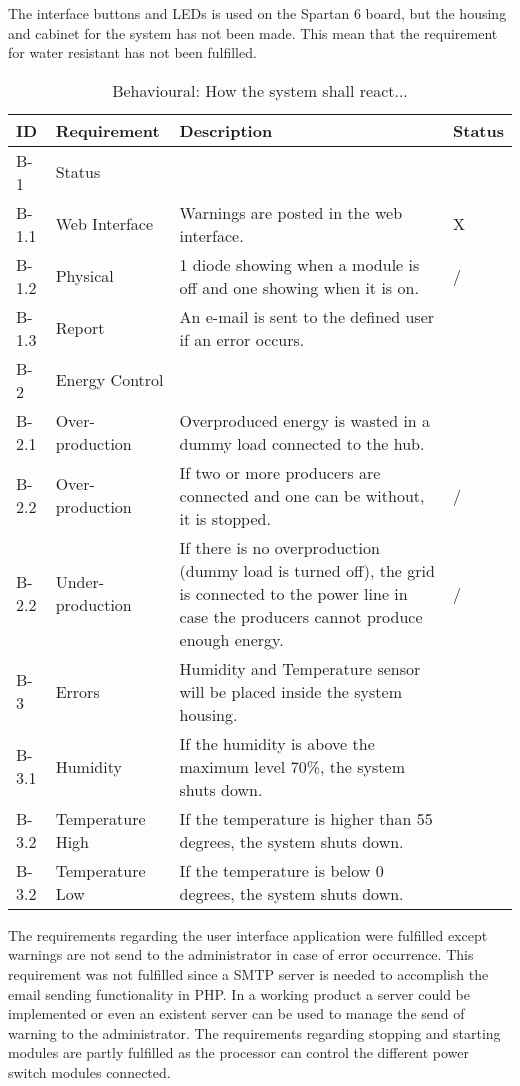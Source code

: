 The interface buttons and LEDs is used on the Spartan 6 board, but the housing and cabinet for the system has not been made. This mean that the requirement for water resistant has not been fulfilled.\\
\begin{table}[H]
	\begin{tabular} [b] {| p{1.1cm} |  p{2.5cm} | p{11.0cm} | p{1.0cm} |}
	\hline
	\textbf{ID} & \textbf{Requirement} & \textbf{Description} & Status\\\hline
		B-1 	&  Status 			& ~ & ~ \\ \hline
		B-1.1 & Web Interface	& Warnings are posted in the web interface. & X \\\hline
		B-1.2 & Physical		& 1 diode showing when a module is off and one showing when it is on. & / \\ \hline
		B-1.3 & Report			& An e-mail is sent to the defined user if an error occurs. & ~ \\\hline
		B-2 & Energy Control	& ~ & ~ \\\hline
		B-2.1 & Over-production	& Overproduced energy is wasted in a dummy load connected to the hub. & ~ \\\hline
		B-2.2 & Over-production	& If two or more producers are connected and one can be without, it is stopped. & / \\\hline
		B-2.2 & Under-production	& If there is no overproduction (dummy load is turned off), the grid is connected to the power line in case the producers cannot produce enough energy. & / \\\hline
		B-3 & Errors	 		& Humidity and Temperature sensor will be placed inside the system housing. & ~ \\\hline
		B-3.1 & Humidity		& If the humidity is above the maximum level 70\%, the system shuts down. & ~ \\\hline
		B-3.2 & Temperature High& If the temperature is higher than 55 degrees,  the system shuts down. & ~ \\\hline
		B-3.2 & Temperature Low & If the temperature is below 0 degrees, the system shuts down. & ~ \\\hline
	\end{tabular}
	\caption{Behavioural: How the system shall react...}
\end{table}
The requirements regarding the user interface application were fulfilled except warnings are not send to the administrator in case of error occurrence. This requirement was not fulfilled since a SMTP server is needed to accomplish the email sending functionality in PHP. In a working product a server could be implemented or even an existent server can be used to manage the send of warning to the administrator.
\p The requirements regarding stopping and starting modules are partly fulfilled as the processor can control the different power switch modules connected. 


